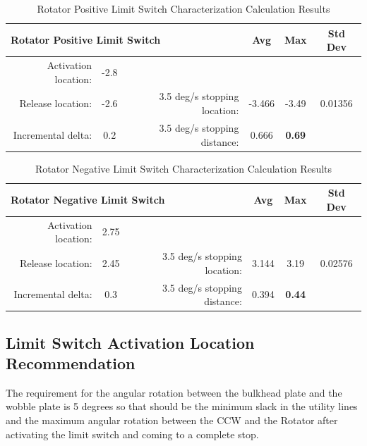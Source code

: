 \documentclass[SE,authoryear,toc, lsstdraft]{lsstdoc}
\begin{document}
\begin{landscape}
\begin{table}[h!]
  \begin{center}
    \caption{Rotator Positive Limit Switch Characterization Calculation Results}
    \label{tab:table3}
    \begin{tabular}{r|c|r|c|c|c}
    \multicolumn{3}{l|}{\textbf{Rotator Positive Limit Switch}} & Avg & Max & Std Dev\\
    \midrule
    Activation location: & -2.8 & & & & \\
    Release location: & -2.6 & 3.5 deg/s stopping location: & -3.466 & -3.49 & 0.01356 \\
    Incremental delta: & 0.2 & 3.5 deg/s stopping distance: & 0.666 & \textbf{0.69} & \\
    \end{tabular}
  \end{center}
\end{table}

\begin{table}[h!]
  \begin{center}
    \caption{Rotator Negative Limit Switch Characterization Calculation Results}
    \label{tab:table4}
    \begin{tabular}{r|c|r|c|c|c}
    \multicolumn{3}{l|}{\textbf{Rotator Negative Limit Switch}} & Avg & Max & Std Dev\\
    \midrule
    Activation location: & 2.75 & & & & \\
    Release location: & 2.45 & 3.5 deg/s stopping location: & 3.144 & 3.19 & 0.02576 \\
    Incremental delta: & 0.3 & 3.5 deg/s stopping distance: & 0.394 & \textbf{0.44} & \\
    \end{tabular}
  \end{center}
\end{table}

\end{landscape}

\subsection{Limit Switch Activation Location Recommendation}

The  requirement for the angular rotation between the bulkhead plate and the wobble plate is
5 degrees so that should be the minimum slack in the utility lines and
the maximum angular rotation between the CCW and the Rotator after
activating the limit switch and coming to a complete stop.
\end{document}
